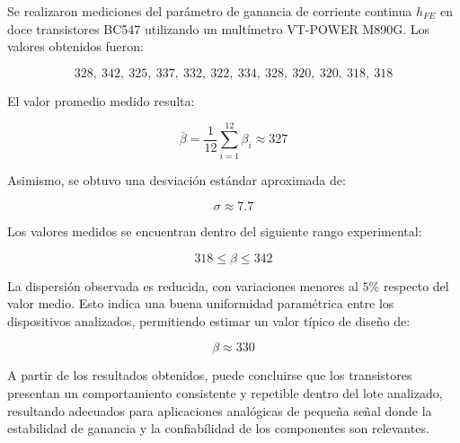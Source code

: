 \documentclass[]{article}
\begin{document}
	
	Se realizaron mediciones del parámetro de ganancia de corriente continua \(h_{FE}\) en doce transistores BC547 utilizando un multímetro VT-POWER M890G. Los valores obtenidos fueron:
	
	\[
	328,\ 342,\ 325,\ 337,\ 332,\ 322,\ 334,\ 328,\ 320,\ 320,\ 318,\ 318
	\]
	
	El valor promedio medido resulta:
	
	\[
	\overline{\beta}=
	\frac{1}{12}\sum_{i=1}^{12}\beta_i
	\approx 327
	\]
	
	Asimismo, se obtuvo una desviación estándar aproximada de:
	
	\[
	\sigma \approx 7.7
	\]
	
	Los valores medidos se encuentran dentro del siguiente rango experimental:
	
	\[
	318 \leq \beta \leq 342
	\]
	
	La dispersión observada es reducida, con variaciones menores al \(5\%\) respecto del valor medio. Esto indica una buena uniformidad paramétrica entre los dispositivos analizados, permitiendo estimar un valor típico de diseño de:
	
	\[
	\beta \approx 330
	\]
	
	A partir de los resultados obtenidos, puede concluirse que los transistores presentan un comportamiento consistente y repetible dentro del lote analizado, resultando adecuados para aplicaciones analógicas de pequeña señal donde la estabilidad de ganancia y la confiabílidad de los componentes son relevantes.
	
\end{document}
